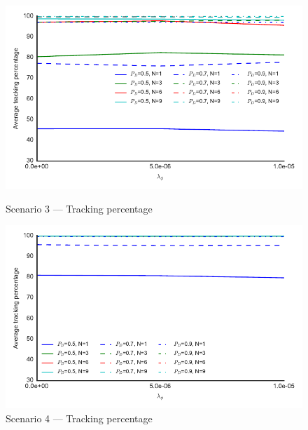 \begin{figure}
\centering
\includegraphics{Figures/plots/Scenario3_Tracking-TrackingPercentage.pdf}
\caption{Scenario 3 --- Tracking percentage}\label{fig:scenario3_tracking_percentage}

\includegraphics{Figures/plots/Scenario4_Tracking-TrackingPercentage.pdf}
\caption{Scenario 4 --- Tracking percentage}\label{fig:scenario4_tracking_percentage}
\end{figure}

